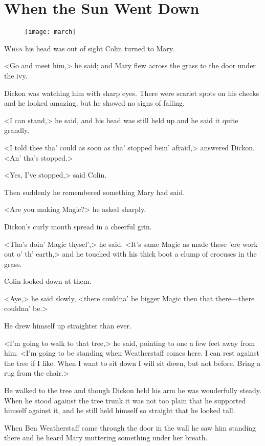 \chapter{When the Sun Went Down} 
	
\begin{figure}[t!]
\centering
\texttt{[image: march]}
\end{figure}

	\lettrine[]{W}{hen} his head was out of sight Colin turned to Mary.

\zz
<Go and meet him,> he said; and Mary flew across the grass to the door under the ivy.

\zz
Dickon was watching him with sharp eyes. There were scarlet spots on his cheeks and he looked amazing, but he showed no signs of falling.

<I can stand,> he said, and his head was still held up and he said it quite grandly.

<I told thee tha' could as soon as tha' stopped bein' afraid,> answered Dickon. <An' tha's stopped.>

<Yes, I've stopped,> said Colin.

Then suddenly he remembered something Mary had said.

<Are you making Magic?> he asked sharply.

Dickon's curly mouth spread in a cheerful grin.

<Tha's doin' Magic thysel',> he said. <It's same Magic as made these 'ere work out o' th' earth,> and he touched with his thick boot a clump of crocuses in the grass.

Colin looked down at them.

<Aye,> he said slowly, <there couldna' be bigger Magic then that there—there couldna' be.>

He drew himself up straighter than ever.

<I'm going to walk to that tree,> he said, pointing to one a few feet away from him. <I'm going to be standing when Weatherstaff comes here. I can rest against the tree if I like. When I want to sit down I will sit down, but not before. Bring a rug from the chair.>

He walked to the tree and though Dickon held his arm he was wonderfully steady. When he stood against the tree trunk it was not too plain that he supported himself against it, and he still held himself so straight that he looked tall.

When Ben Weatherstaff came through the door in the wall he saw him standing there and he heard Mary muttering something under her breath.

